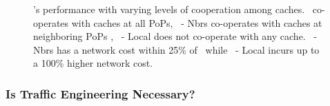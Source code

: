 {\begin{figure}[t]
\begin{center}
\end{center}
\caption{\invlru's performance with varying levels of cooperation among caches. \invlru\ co-operates with caches at all PoPs, \invlru\ - Nbrs co-operates with caches at neighboring PoPs , \invlru\ - Local does not co-operate with any cache. \invlru\ - Nbrs has a network cost within 25\% of \invlru\ while \invlru\ - Local incurs up to a 100\% higher network cost.}
\label{fig:lrulocalnew}
\end{figure}
}





\subsubsection{Is Traffic Engineering Necessary?}


